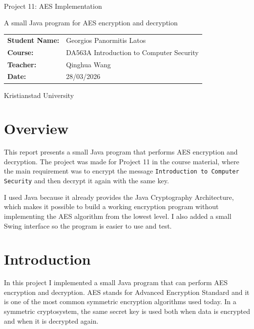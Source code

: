 \documentclass[12pt,a4paper]{article}
\begin{document}
\begin{titlepage}
    \centering
    \vspace*{1.8cm}
    {\LARGE Project 11: AES Implementation\par}
    \vspace{0.8cm}
    {\large A small Java program for AES encryption and decryption\par}
    \vspace{1.8cm}

    \renewcommand{\arraystretch}{1.4}
    \begin{tabular}{>{\bfseries}p{3.2cm}p{8.5cm}}
        Student Name: & Georgios Panormitis Latos \\
        Course: & DA563A Introduction to Computer Security \\
        Teacher: & Qinghua Wang \\
        Date: & 28/03/2026 \\
    \end{tabular}

    \vfill
    {\large Kristianstad University\par}
\end{titlepage}

\onehalfspacing

\section{Overview}
This report presents a small Java program that performs AES encryption and decryption. The project was made for Project 11 in the course material, where the main requirement was to encrypt the message \texttt{Introduction to Computer Security} and then decrypt it again with the same key.

I used Java because it already provides the Java Cryptography Architecture, which makes it possible to build a working encryption program without implementing the AES algorithm from the lowest level. I also added a small Swing interface so the program is easier to use and test.

\section{Introduction}
In this project I implemented a small Java program that can perform AES encryption and decryption. AES stands for Advanced Encryption Standard and it is one of the most common symmetric encryption algorithms used today. In a symmetric cryptosystem, the same secret key is used both when data is encrypted and when it is decrypted again.
\end{document}
